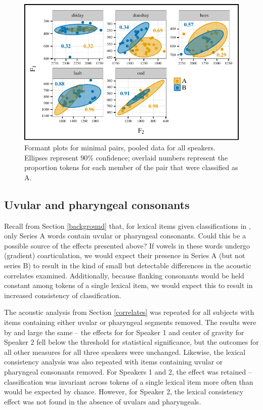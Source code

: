 \documentclass[output=paper,newtxmath,modfonts,nonflat,hidelinks]{langsci/langscibook}
\begin{document}
\begin{figure}
\includegraphics[height=.35\textheight]{figures/notminimalpairs.pdf}
\caption{Formant plots for minimal pairs, pooled data for all speakers.  Ellipses represent 90\% confidence; overlaid numbers represent the proportion tokens for each member of the pair that were classified as A.}
\label{fig:kbgy:5}
\end{figure}

\subsection{Uvular and pharyngeal consonants}
\label{up}

Recall from Section \ref{background} that, for lexical items given classifications in \citet{Andrzejewski1955}, only Series A words contain uvular or pharyngeal consonants.  Could this be a possible source of the effects presented above?  If vowels in these words undergo (gradient) coarticulation, we would expect their presence in Series A (but not series B) to result in the kind of small but detectable differences in the acoustic correlates examined.  Additionally, because flanking consonants would be held constant among tokens of a single lexical item, we would expect this to result in increased consistency of classification.

The acoustic analysis from Section \ref{correlates} was repeated for all subjects with items containing either uvular or pharyngeal segments removed.  The results were by and large the same -- the effects for  for Speaker 1 and center of gravity for Speaker 2 fell below the threshold for statistical significance, but the outcomes for all other measures for all three speakers were unchanged.  Likewise, the lexical consistency analysis was also repeated with items containing uvular or pharyngeal consonants removed.  For Speakers 1 and 2, the effect was retained -- classification was invariant across tokens of a single lexical item more  often than would be expected by chance.  However, for Speaker 2, the lexical consistency effect was not found in the absence of uvulars and pharyngeals.  
\end{document}
